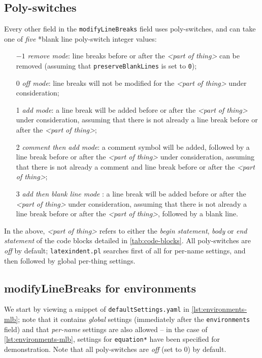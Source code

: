 \subsection{Poly-switches}\label{sec:poly-switches}
	Every other field in the \texttt{modifyLineBreaks} field uses poly-switches, and can
	take one of \emph{five}%
	*{blank line poly-switch} integer values:
	\begin{itemize}[font=\bfseries]
		\item[$-1$] \emph{remove mode}: line breaks before or after the
		      \emph{<part of thing>} can be removed (assuming that \texttt{preserveBlankLines} is
		      set to \texttt{0});
		\item[0] \emph{off mode}: line breaks will not be modified for the
		      \emph{<part of thing>} under consideration;
		\item[1] \emph{add mode}: a line break will be added before or after the
		      \emph{<part of thing>} under consideration, assuming that
		      there is not already a line break before or after the \emph{<part of thing>};
		\item[2] \emph{comment then add mode}: a comment symbol will be added, followed by a line break
		      before or after the \emph{<part of thing>} under consideration, assuming that there
		      is not already a comment and line break before or after the \emph{<part of thing>};
		\item[3] \emph{add then blank line mode}%
		      : a line break will be added before or after the
		      \emph{<part of thing>} under consideration, assuming that
		      there is not already a line break before or after the \emph{<part of thing>},
		      followed by a blank line.
	\end{itemize}
	In the above, \emph{<part of thing>} refers to either the
	\emph{begin statement}, \emph{body} or \emph{end statement}
	of the code blocks detailed in \vref{tab:code-blocks}. All poly-switches are
	\emph{off} by default; \texttt{latexindent.pl} searches first of all
	for per-name settings, and then followed by global per-thing settings.

\subsection{modifyLineBreaks for environments}\label{sec:modifylinebreaks-environments}
	We start by viewing a snippet of \texttt{defaultSettings.yaml} in
	\cref{lst:environments-mlb}; note that it contains \emph{global} settings
	(immediately after the \texttt{environments} field) and that
	\emph{per-name} settings are also allowed -- in the case of
	\cref{lst:environments-mlb}, settings for \texttt{equation*} have been specified
	for demonstration. Note that all poly-switches are \emph{off} (set to 0) by
	default.

